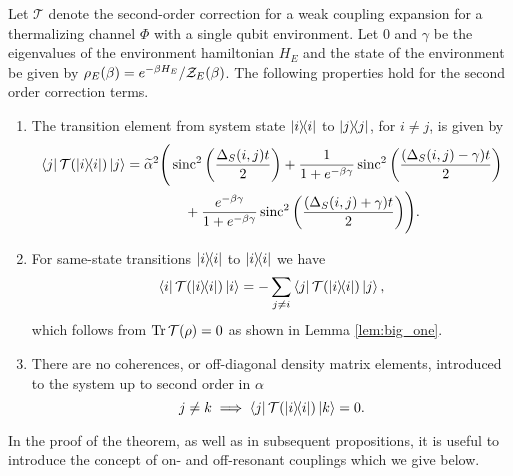 \begin{theorem} \label{thm:second_order_transition}
Let $\mathcal{T}$ denote the second-order correction for a weak coupling expansion for a thermalizing channel $\Phi$ with a single qubit environment. Let 0 and $\gamma$ be the eigenvalues of the environment hamiltonian $H_E$ and the state of the environment be given by $\rho_E(\beta) = e^{-\beta H_E} / \mathcal{Z}_E(\beta)$. The following properties hold for the second order correction terms.
\begin{enumerate}
    \item 
The transition element from system state $\ketbra{i}{i}$ to $\ketbra{j}{j}$, for $i \neq j$, is given by
\begin{align}
    \bra{j}\mathcal{T}(\ketbra{i}{i}) \ket{j} = \widetilde{\alpha}^2 \Biggr(& \operatorname{sinc}^2 \left( \frac{\Delta_S(i,j)t}{2} \right) + \frac{1}{1 + e^{-\beta \gamma}} \operatorname{sinc}^2 \left( \frac{(\Delta_S(i,j) - \gamma)t}{2} \right) \nonumber\\
    &\quad+  \frac{e^{-\beta \gamma}}{1 + e^{-\beta \gamma}} \operatorname{sinc}^2 \left( \frac{(\Delta_S(i,j) + \gamma)t}{2} \right) \Biggr). \label{eq:transition_terms_total}
\end{align}
\item For same-state transitions $\ketbra{i}{i}$ to $\ketbra{i}{i}$ we have
\begin{equation}
    \bra{i}\mathcal{T}(\ketbra{i}{i})\ket{i} = - \sum_{j \neq i} \bra{j} \mathcal{T}(\ketbra{i}{i}) \ket{j},
\end{equation}
which follows from $\Tr \mathcal{T}(\rho) = 0$ as shown in Lemma \ref{lem:big_one}. 
\item There are no coherences, or off-diagonal density matrix elements, introduced to the system up to second order in $\alpha$
\begin{equation}
    j \neq k \implies \bra{j} \mathcal{T}(\ketbra{i}{i}) \ket{k} = 0.
\end{equation}

\end{enumerate}
\end{theorem}
In the proof of the theorem, as well as in subsequent propositions, it is useful to introduce the concept of on- and off-resonant couplings which we give below.
